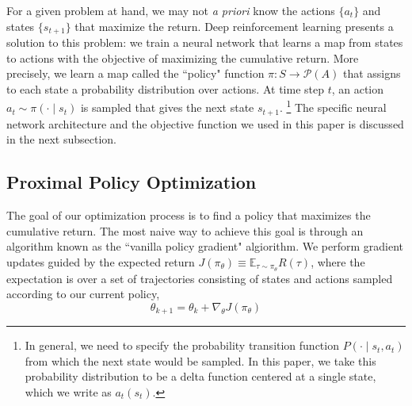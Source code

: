 For a given problem at hand, we may not \textit{a priori} know the actions $\{a_t\}$ and states $\{s_{t+1}\}$ that maximize the return. Deep reinforcement learning presents a solution to this problem: we train a neural network that learns a map from states to actions with the objective of maximizing the cumulative return. More precisely, we learn a map called the ``policy" function $\pi : S \to \mathcal{P}(A)$ that assigns to each state a probability distribution over actions. At time step $t$, an action $a_t \sim \pi(\cdot \mid s_t)$ is sampled that gives the next state $s_{t+1}$.
\footnote{In general, we need to specify the probability transition function $P(\cdot \mid s_t, a_t)$  from which the next state would be sampled. In this paper, we take this probability distribution to be a delta function centered at a single state, which we write as $a_t(s_t)$.} 
The specific neural network architecture and the objective function we used in this paper is discussed in the next subsection.
\newline 

\subsection{Proximal Policy Optimization} \label{sec:ppo}

The goal of our optimization process is to find a policy that maximizes the cumulative return. The most naive way to achieve this goal is through an algorithm known as the ``vanilla policy gradient" algiorithm. We perform gradient updates guided by the expected return $J(\pi_\theta) \equiv \mathbb{E}_{\tau \sim \pi_\theta} R(\tau)$, where the expectation is over a set of trajectories consisting of states and actions sampled according to our current policy, 
\[
\theta_{k+1} = \theta_k + \nabla_\theta J(\pi_\theta)
\]

